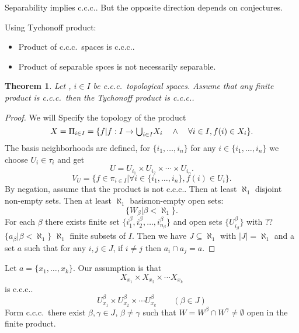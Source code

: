\documentclass[11pt,pdftex,twoside,a4paper]{article}
\newcommand{\ccc}{c.c.c.}
\newtheorem{thm}{Theorem}[section]
\begin{document}
Separability implies \ccc. But the opposite direction depends
on conjectures.

Using Tychonoff product:
\begin{itemize}
\item Product of \ccc\ spaces is \ccc.
\item Product of separable spces is not necessarily separable.
\end{itemize}

\begin{thm}
Let , \(i\in I\) be \ccc\ topological spaces.
Assume that any finite product is \ccc\ then
the Tychonoff product  is \ccc.
\end{thm}
\begin{proof}
We will Specify the  topology of the product
\begin{equation*}
X = \Pi_{i\in I} = \{f | 
  f: I \to\mathsmaller{\bigcup_{i\in I}} X_i
  \quad\land\quad \forall i\in I, f(i)\in X_i\}.
\end{equation*}
The basis neighborhoods are defined, for \(\{i_1,\ldots,i_n\}\)
for any \(i \in \{i_1,\ldots,i_n\}\)
we choose \(U_i \in \tau_i\) and get
\begin{equation*}
 U = U_{i_1} \times U_{i_2} \times \cdots \times U_{i_n}.
\end{equation*}
\begin{equation*}
 V_U = \{f \in \pi_{i\in I}| \forall i \in \{i_1,\ldots,i_n\}, f(i)\in U_i\}.
\end{equation*}
By negation, assume that the product is not \ccc.
Then at least \(\aleph_1\) disjoint non-empty sets.
Then at least \(\aleph_1\) basisnon-empty open sets:
\begin{equation*}
 \{W_\beta | \beta < \aleph_1\}.
\end{equation*}
For each \(\beta\) there exists finite set
\(\{i_1^\beta, i_2^\beta, \ldots, i_{n_\beta}^\beta\}\)
and open sets \(\{U_{i_\beta}^\beta\}\)
with ??  \(\{a_\beta | \beta < \aleph_1\}\)
\(\aleph_1\) finite subsets of $I$.
Then we have \(J \subseteq \aleph_1\) with \(|J|=\aleph_1\)
and a set $a$ such that for any \(i,j\in J\), 
if \(i\neq j\) then \(a_i \cap a_j = a\).
\end{proof}

Let \(a = \{x_1,\ldots,x_k\}\). Our assumption is that
\begin{equation*}
X_{x_1} \times X_{x_2} \times \cdots X_{x_k}
\end{equation*}
is \ccc.
\begin{equation*}
U_{x_1}^\beta \times U_{x_2}^\beta \times \cdots U_{x_k}^\beta \qquad (\beta \in J)
\end{equation*}
Form \ccc\ there exist \(\beta,\gamma \in J\), \(\beta\neq\gamma\)
such that \(W = W^\beta \cap W^\gamma \neq \emptyset\)
open in the finite product.
\end{document}
